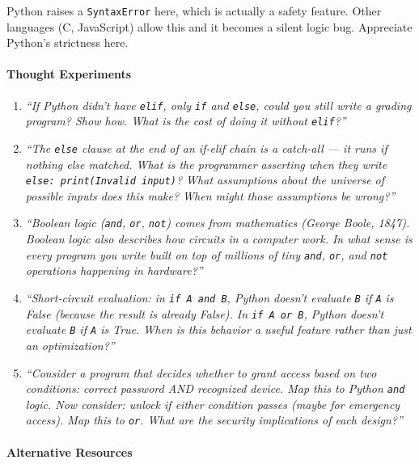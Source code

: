 \documentclass[
  justified,
  openright,
]{tufte-book}
\let\paragraph\paragraph
\let\paragraph\paragraph
\begin{document}
Python raises a \texttt{SyntaxError} here, which is actually a safety
feature. Other languages (C, JavaScript) allow this and it becomes a
silent logic bug. Appreciate Python's strictness here.

\paragraph{Thought Experiments}\label{thought-experiments-9}

\begin{enumerate}
\def\labelenumi{\arabic{enumi}.}
\item
  \emph{``If Python didn't have \texttt{elif}, only \texttt{if} and
  \texttt{else}, could you still write a grading program? Show how. What
  is the cost of doing it without \texttt{elif}?''}
\item
  \emph{``The \texttt{else} clause at the end of an if-elif chain is a
  catch-all --- it runs if nothing else matched. What is the programmer
  asserting when they write
  \texttt{else:\ print(\textquotesingle{}Invalid\ input\textquotesingle{})}?
  What assumptions about the universe of possible inputs does this make?
  When might those assumptions be wrong?''}
\item
  \emph{``Boolean logic (\texttt{and}, \texttt{or}, \texttt{not}) comes
  from mathematics (George Boole, 1847). Boolean logic also describes
  how circuits in a computer work. In what sense is every program you
  write built on top of millions of tiny \texttt{and}, \texttt{or}, and
  \texttt{not} operations happening in hardware?''}
\item
  \emph{``Short-circuit evaluation: in \texttt{if\ A\ and\ B}, Python
  doesn't evaluate \texttt{B} if \texttt{A} is False (because the result
  is already False). In \texttt{if\ A\ or\ B}, Python doesn't evaluate
  \texttt{B} if \texttt{A} is True. When is this behavior a useful
  feature rather than just an optimization?''}
\item
  \emph{``Consider a program that decides whether to grant access based
  on two conditions: correct password AND recognized device. Map this to
  Python \texttt{and} logic. Now consider: unlock if either condition
  passes (maybe for emergency access). Map this to \texttt{or}. What are
  the security implications of each design?''}
\end{enumerate}

\paragraph{Alternative Resources}\label{alternative-resources-2}
\end{document}
